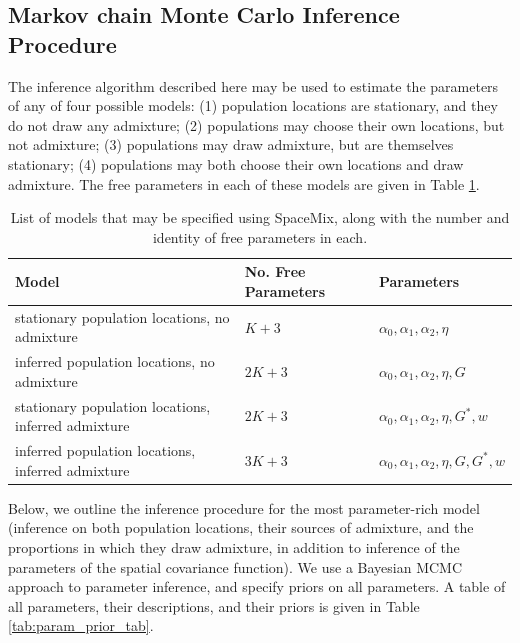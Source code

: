 \documentclass[12pt]{article}
\newcommand{\identifyadmixsource}[1]{{#1^{*}}}
\begin{document}
\subsection*{Markov chain Monte Carlo Inference Procedure}
The inference algorithm described here may be used to estimate the parameters of any of four possible models: (1) population locations are stationary, and they do not draw any admixture; (2) populations may choose their own locations, but not admixture; (3) populations may draw admixture, but are themselves stationary; (4) populations may both choose their own locations and draw admixture.  The free parameters in each of these models are given in Table \ref{tab:model_options}.

\begin{centering}
\begin{table}
\begin{tabular}{| >{\centering\arraybackslash}m{6cm} | >{\centering\arraybackslash}m{3cm} | l |}
	\hline
	\textbf{Model} & \textbf{No. Free Parameters} & \textbf{Parameters}\\ \hline
	stationary population locations, no admixture & $K + 3$	& $\alpha_0,\alpha_1,\alpha_2,\eta$	\\ \hline
	inferred population locations, \hspace{0.5cm}no admixture & $2K + 3$	& $\alpha_0,\alpha_1,\alpha_2,\eta,G$	\\ \hline
	stationary population locations, inferred admixture & $2K + 3$	& $\alpha_0,\alpha_1,\alpha_2,\eta,\identifyadmixsource{G},w$	\\ \hline
	inferred population locations, inferred admixture & $3K + 3$	&$\alpha_0,\alpha_1,\alpha_2,\eta,G,\identifyadmixsource{G},w$	\\
	\hline
\end{tabular}
\caption{
    List of models that may be specified using SpaceMix, along with the number and identity of free parameters in each.
}\label{tab:model_options}
\end{table}
\end{centering}

Below, we outline the inference procedure for the most parameter-rich model (inference on both population locations, their sources of admixture, and the proportions in which they draw admixture, in addition to inference of the parameters of the spatial covariance function).
We use a Bayesian MCMC approach to parameter inference, and specify priors on all parameters.  A table of all parameters, their descriptions, and their priors is given in Table \ref{tab:param_prior_tab}.
\end{document}
